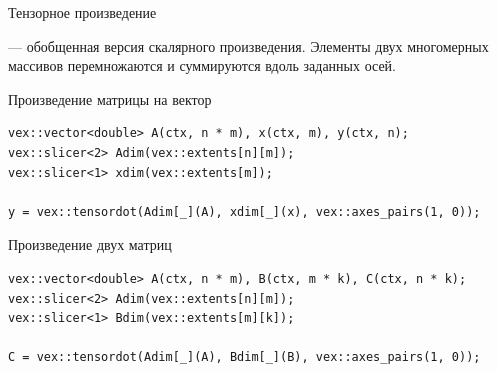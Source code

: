 \documentclass[@BEAMER_OPTIONS@]{beamer}
\begin{document}
\begin{frame}[fragile]{Тензорное произведение}
    \begin{description}[\;\;]
        \item[Тензорное произведение] --- обобщенная версия скалярного
            произведения.  Элементы двух многомерных массивов перемножаются и
            суммируются вдоль заданных осей.
    \end{description}
    \begin{exampleblock}{Произведение матрицы на вектор}
        \begin{lstlisting}
vex::vector<double> A(ctx, n * m), x(ctx, m), y(ctx, n);
vex::slicer<2> Adim(vex::extents[n][m]);
vex::slicer<1> xdim(vex::extents[m]);

y = vex::tensordot(Adim[_](A), xdim[_](x), vex::axes_pairs(1, 0));
        \end{lstlisting}
    \end{exampleblock}
    \begin{exampleblock}{Произведение двух матриц}
        \begin{lstlisting}
vex::vector<double> A(ctx, n * m), B(ctx, m * k), C(ctx, n * k);
vex::slicer<2> Adim(vex::extents[n][m]);
vex::slicer<1> Bdim(vex::extents[m][k]);

C = vex::tensordot(Adim[_](A), Bdim[_](B), vex::axes_pairs(1, 0));
        \end{lstlisting}
    \end{exampleblock}
\end{frame}
\end{document}

